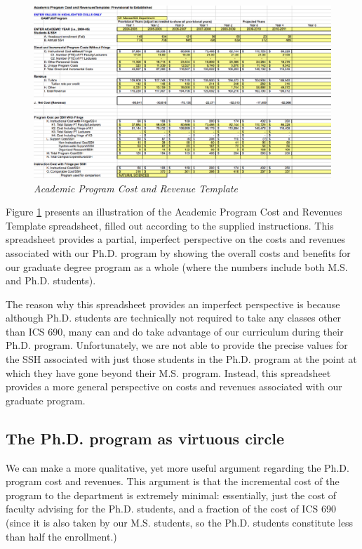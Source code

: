 \documentclass[12pt]{article}
\begin{document}
\begin{figure}[ht]
  \center
  \includegraphics{costs.eps}
  \caption{\em \small Academic Program Cost and Revenue Template}
  \label{fig:costs}
\end{figure} 

Figure \ref{fig:costs} presents an illustration of the Academic Program
Cost and Revenues Template spreadsheet, filled out according to the
supplied instructions.  This spreadsheet provides a partial, imperfect
perspective on the costs and revenues associated with our Ph.D. program by
showing the overall costs and benefits for our graduate degree program as a
whole (where the numbers include both M.S. and Ph.D. students).

The reason why this spreadsheet provides an imperfect perspective is
because although Ph.D. students are technically not required to take any
classes other than ICS 690, many can and do take advantage of our
curriculum during their Ph.D. program.  Unfortunately, we are not able to
provide the precise values for the SSH associated with just those students
in the Ph.D. program at the point at which they have gone beyond their
M.S. program. Instead, this spreadsheet provides a more general perspective on costs and
revenues associated with our graduate program. 

\subsection{The Ph.D. program as virtuous circle}
\label{sec:virtuous-circle}

We can make a more qualitative, yet more useful argument regarding the
Ph.D. program cost and revenues.  This argument is that the incremental
cost of the program to the department is extremely minimal: essentially,
just the cost of faculty advising for the Ph.D. students, and a fraction of
the cost of ICS 690 (since it is also taken by our M.S. students, so the
Ph.D. students constitute less than half the enrollment.)
\end{document}
